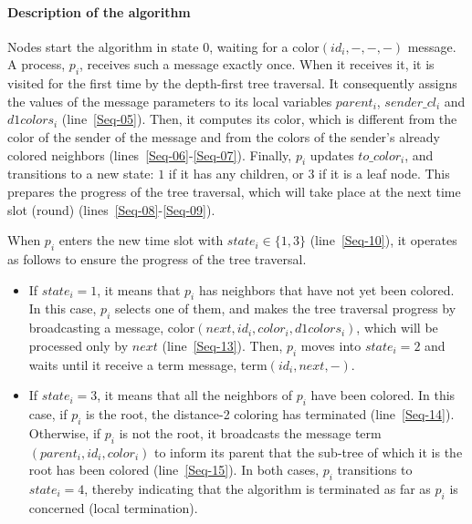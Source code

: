 \documentclass[11pt,english]{article}
\newcommand{\donecol}{\mathit{d1colors}}
\newcommand{\term}{{\sc term}\xspace}
\begin{document}
\paragraph{Description of the algorithm}
Nodes start the algorithm in state $0$, waiting for a {\sc
  color}$(id_i,-,-,-)$ message.  A process, $p_i$, receives such a
message exactly once.  When it receives it, it is visited for the
first time by the depth-first tree traversal.  It consequently assigns
the values of the message parameters to its local variables
$parent_i$, $sender\_cl_i$ and $\donecol_i$ (line~\ref{Seq-05}).
Then, it computes its color, which is different from the color of the
sender of the message and from the colors of the sender's already
colored neighbors (lines~\ref{Seq-06}-\ref{Seq-07}). Finally, $p_i$
updates $to\_color_i$, and transitions to a new state: $1$ if it has
any children, or $3$ if it is a leaf node. This prepares the progress
of the tree traversal, which will take place at the next time slot
(round) (lines~\ref{Seq-08}-\ref{Seq-09}).




















When $p_i$ enters the new time slot with $state_i\in\{1,3\}$
(line~\ref{Seq-10}), it operates as follows to ensure the progress
of the tree traversal.
\begin{itemize}
\vspace{-0.1cm}
\item If $state_i=1$, it means that $p_i$ has neighbors that have not
  yet been colored. In this case, $p_i$ selects one of them, and makes
  the tree traversal progress by broadcasting a message, {\sc
    color}$(next,id_i,color_i,\donecol_i)$, which will be processed
  only by $next$ (line~\ref{Seq-13}).  Then, $p_i$ moves into
  $state_i=2$ and waits until it receive a \term message, {\sc
    term}$(id_i,next,-)$.

\vspace{-0.1cm}
\item If $state_i=3$, it means that all the neighbors of $p_i$ have
  been colored. In this case, if $p_i$ is the root, the distance-2
  coloring has terminated (line~\ref{Seq-14}). Otherwise, if $p_i$ is
  not the root, it broadcasts the message {\sc
    term}$(parent_i,id_i,color_i)$ to inform its parent that the
  sub-tree of which it is the root has been colored
  (line~\ref{Seq-15}).  In both cases, $p_i$ transitions to
  $state_i=4$, thereby indicating that the algorithm is terminated as
  far as $p_i$ is concerned (local termination).
\end{itemize}
\end{document}
